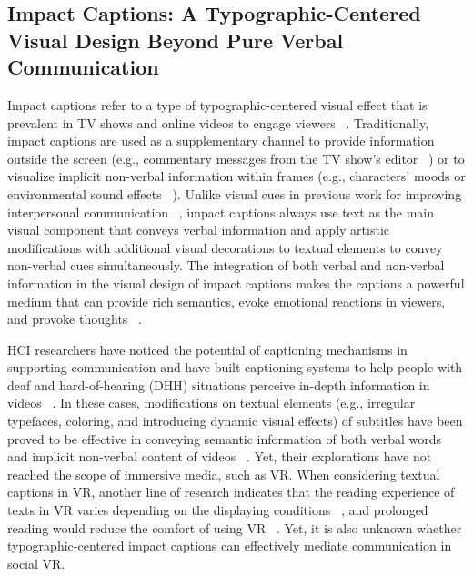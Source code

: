 \subsection{Impact Captions: A Typographic-Centered Visual Design Beyond Pure Verbal Communication}
Impact captions refer to a type of typographic-centered visual effect that is prevalent in TV shows and online videos to engage viewers ~\cite{sasamoto2014impact}. 
Traditionally, impact captions are used as a supplementary channel to provide information outside the screen (e.g., commentary messages from the TV show's editor ~\cite{o2010japanese}) or to visualize implicit non-verbal information within frames (e.g., characters’ moods or environmental sound effects ~\cite{wang2016visualizing}).
Unlike visual cues in previous work for improving interpersonal communication ~\cite{liao2022realitytalk, liu2023visual, cao2024elastica, an2024emowear, chen2021bubble, aoki2022emoballoon, choi2019emotype}, impact captions always use text as the main visual component that conveys verbal information and apply artistic modifications with additional visual decorations to textual elements to convey non-verbal cues simultaneously. The integration of both verbal and non-verbal information in the visual design of impact captions makes the captions a powerful medium that can provide rich semantics, evoke emotional reactions in viewers, and provoke thoughts ~\cite{o2010japanese, sasamoto2021hookability, chow2023impact}.

HCI researchers have noticed the potential of captioning mechanisms in supporting communication and have built captioning systems to help people with deaf and hard-of-hearing (DHH) situations perceive in-depth information in videos ~\cite{kim2023visible, de2023visualization, bragg2017designing, wang2016visualizing, seto2010subtitle}. In these cases, modifications on textual elements (e.g., irregular typefaces, coloring, and introducing dynamic visual effects) of subtitles have been proved to be effective in conveying semantic information of both verbal words and implicit non-verbal content of videos ~\cite{kim2023visible, de2023visualization, seto2010subtitle}. Yet, their explorations have not reached the scope of immersive media, such as VR.
When considering textual captions in VR, another line of research indicates that the reading experience of texts in VR varies depending on the displaying conditions ~\cite{rzayev2021reading}, and prolonged reading would reduce the comfort of using VR ~\cite{ubur2024easycaption}. 
Yet, it is also unknown whether typographic-centered impact captions can effectively mediate communication in social VR.

